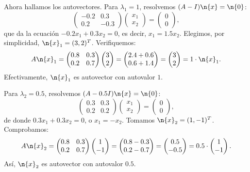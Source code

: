 Ahora hallamos los autovectores. Para \(\lambda_1 = 1\), resolvemos \((A - I)\n{x} = \n{0}\):
\[
\begin{pmatrix} -0.2 & 0.3 \\ 0.2 & -0.3 \end{pmatrix} \begin{pmatrix} x_1 \\ x_2 \end{pmatrix} = \begin{pmatrix} 0 \\ 0 \end{pmatrix},
\]
que da la ecuación \(-0.2x_1 + 0.3x_2 = 0\), es decir, \(x_1 = 1.5 x_2\). Elegimos, por simplicidad, \(\n{x}_1 = (3,2)^T\). Verifiquemos:
\[
A\n{x}_1 = \begin{pmatrix} 0.8 & 0.3 \\ 0.2 & 0.7 \end{pmatrix} \begin{pmatrix} 3 \\ 2 \end{pmatrix}
= \begin{pmatrix} 2.4 + 0.6 \\ 0.6 + 1.4 \end{pmatrix} = \begin{pmatrix} 3 \\ 2 \end{pmatrix} = 1 \cdot \n{x}_1.
\]
Efectivamente, \(\n{x}_1\) es autovector con autovalor \(1\).

Para \(\lambda_2 = 0.5\), resolvemos \((A - 0.5 I)\n{x} = \n{0}\):
\[
\begin{pmatrix} 0.3 & 0.3 \\ 0.2 & 0.2 \end{pmatrix} \begin{pmatrix} x_1 \\ x_2 \end{pmatrix} = \begin{pmatrix} 0 \\ 0 \end{pmatrix},
\]
de donde \(0.3x_1 + 0.3x_2 = 0\), o \(x_1 = -x_2\). Tomamos \(\n{x}_2 = (1,-1)^T\). Comprobamos:
\[
A\n{x}_2 = \begin{pmatrix} 0.8 & 0.3 \\ 0.2 & 0.7 \end{pmatrix} \begin{pmatrix} 1 \\ -1 \end{pmatrix}
= \begin{pmatrix} 0.8 - 0.3 \\ 0.2 - 0.7 \end{pmatrix} = \begin{pmatrix} 0.5 \\ -0.5 \end{pmatrix} = 0.5 \cdot \begin{pmatrix} 1 \\ -1 \end{pmatrix}.
\]
Así, \(\n{x}_2\) es autovector con autovalor \(0.5\).

